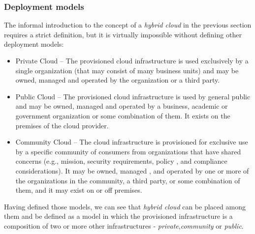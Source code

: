 \subsubsection{Deployment models}
The informal introduction to the concept of a \emph{hybrid cloud} in the previous section requires a strict definition, but it is virtually impossible without defining other deployment models:
\begin{itemize}
  \item Private Cloud -- The provisioned cloud infrastructure is used exclusively by a single organization (that may consist of many business units) and may be owned, managed and operated by the organization or a third party.
  \item Public Cloud -- The provisioned cloud infrastructure is used by general public and may be owned, managed and operated by a business, academic or government organization or some combination of them. It exists on the premises of the cloud provider.
  \item Community Cloud -- The cloud infrastructure is provisioned for exclusive use by a specific community of consumers from organizations that have shared concerns (e.g., mission, security requirements, policy , and compliance considerations). It may be owned, managed , and operated by one or more of the organizations in the community, a third party, or some combination of them, and it may exist on or off premises. 
\end{itemize}
Having defined those models, we can see that \emph{hybrid cloud} can be placed among them and be defined as a model in which the provisioned infrastructure is a composition of two or more other infrastructures - \emph{private},\emph{community} or \emph{public}.

